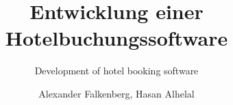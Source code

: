 \documentclass[envcountsame, envcountchap, deutsch]{i-studis}
\begin{document}
\title{Entwicklung einer Hotelbuchungssoftware}
\subtitle{Development of hotel booking software}

\author{Alexander Falkenberg, Hasan Alhelal}


\address{Trier}


\mytitlepage

\frontmatter					%
\tableofcontents										%
\listoffigures											%


\mainmatter









\backmatter
\printindex												%


\begin{appendix}
\end{appendix}
\end{document}
